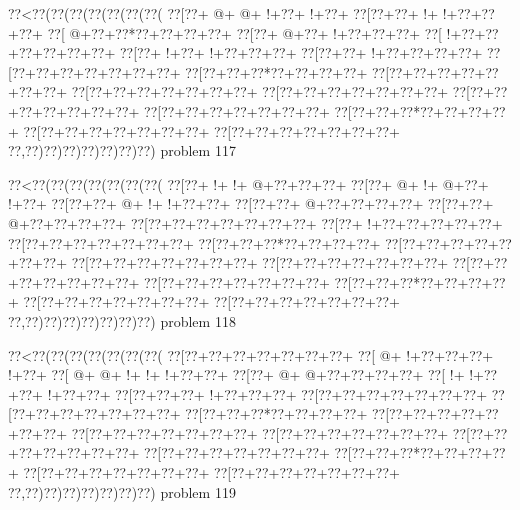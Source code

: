 \vbox{\vbox{\goo
\0??<\0??(\0??(\0??(\0??(\0??(\0??(\0??(
\0??[\0??+\- @+\- @+\- !+\0??+\- !+\0??+
\0??[\0??+\0??+\- !+\- !+\0??+\0??+\0??+
\0??[\- @+\0??+\0??*\0??+\0??+\0??+\0??+
\0??[\0??+\- @+\0??+\- !+\0??+\0??+\0??+
\0??[\- !+\0??+\0??+\0??+\0??+\0??+\0??+
\0??[\0??+\- !+\0??+\- !+\0??+\0??+\0??+
\0??[\0??+\0??+\- !+\0??+\0??+\0??+\0??+
\0??[\0??+\0??+\0??+\0??+\0??+\0??+\0??+
\0??[\0??+\0??+\0??*\0??+\0??+\0??+\0??+
\0??[\0??+\0??+\0??+\0??+\0??+\0??+\0??+
\0??[\0??+\0??+\0??+\0??+\0??+\0??+\0??+
\0??[\0??+\0??+\0??+\0??+\0??+\0??+\0??+
\0??[\0??+\0??+\0??+\0??+\0??+\0??+\0??+
\0??[\0??+\0??+\0??+\0??+\0??+\0??+\0??+
\0??[\0??+\0??+\0??*\0??+\0??+\0??+\0??+
\0??[\0??+\0??+\0??+\0??+\0??+\0??+\0??+
\0??[\0??+\0??+\0??+\0??+\0??+\0??+\0??+
\0??,\0??)\0??)\0??)\0??)\0??)\0??)\0??)
}
\hfil problem 117\hfil\break
}

\vbox{\vbox{\goo
\0??<\0??(\0??(\0??(\0??(\0??(\0??(\0??(
\0??[\0??+\- !+\- !+\- @+\0??+\0??+\0??+
\0??[\0??+\- @+\- !+\- @+\0??+\- !+\0??+
\0??[\0??+\0??+\- @+\- !+\- !+\0??+\0??+
\0??[\0??+\0??+\- @+\0??+\0??+\0??+\0??+
\0??[\0??+\0??+\- @+\0??+\0??+\0??+\0??+
\0??[\0??+\0??+\0??+\0??+\0??+\0??+\0??+
\0??[\0??+\- !+\0??+\0??+\0??+\0??+\0??+
\0??[\0??+\0??+\0??+\0??+\0??+\0??+\0??+
\0??[\0??+\0??+\0??*\0??+\0??+\0??+\0??+
\0??[\0??+\0??+\0??+\0??+\0??+\0??+\0??+
\0??[\0??+\0??+\0??+\0??+\0??+\0??+\0??+
\0??[\0??+\0??+\0??+\0??+\0??+\0??+\0??+
\0??[\0??+\0??+\0??+\0??+\0??+\0??+\0??+
\0??[\0??+\0??+\0??+\0??+\0??+\0??+\0??+
\0??[\0??+\0??+\0??*\0??+\0??+\0??+\0??+
\0??[\0??+\0??+\0??+\0??+\0??+\0??+\0??+
\0??[\0??+\0??+\0??+\0??+\0??+\0??+\0??+
\0??,\0??)\0??)\0??)\0??)\0??)\0??)\0??)
}
\hfil problem 118\hfil\break
}

\vbox{\vbox{\goo
\0??<\0??(\0??(\0??(\0??(\0??(\0??(\0??(
\0??[\0??+\0??+\0??+\0??+\0??+\0??+\0??+
\0??[\- @+\- !+\0??+\0??+\0??+\- !+\0??+
\0??[\- @+\- @+\- !+\- !+\- !+\0??+\0??+
\0??[\0??+\- @+\- @+\0??+\0??+\0??+\0??+
\0??[\- !+\- !+\0??+\0??+\- !+\0??+\0??+
\0??[\0??+\0??+\0??+\- !+\0??+\0??+\0??+
\0??[\0??+\0??+\0??+\0??+\0??+\0??+\0??+
\0??[\0??+\0??+\0??+\0??+\0??+\0??+\0??+
\0??[\0??+\0??+\0??*\0??+\0??+\0??+\0??+
\0??[\0??+\0??+\0??+\0??+\0??+\0??+\0??+
\0??[\0??+\0??+\0??+\0??+\0??+\0??+\0??+
\0??[\0??+\0??+\0??+\0??+\0??+\0??+\0??+
\0??[\0??+\0??+\0??+\0??+\0??+\0??+\0??+
\0??[\0??+\0??+\0??+\0??+\0??+\0??+\0??+
\0??[\0??+\0??+\0??*\0??+\0??+\0??+\0??+
\0??[\0??+\0??+\0??+\0??+\0??+\0??+\0??+
\0??[\0??+\0??+\0??+\0??+\0??+\0??+\0??+
\0??,\0??)\0??)\0??)\0??)\0??)\0??)\0??)
}
\hfil problem 119\hfil\break
}


